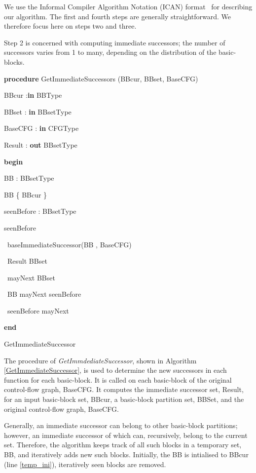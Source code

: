 \documentclass[3p,times,procedia,twocolumn,letterpaper]{elsarticle}
\begin{document}
We use the Informal Compiler Algorithm Notation (ICAN) format~\cite{j} for describing our algorithm. The first and fourth steps are generally straightforward. We therefore focus here on steps two and three.
 
Step 2 is concerned with computing immediate successors; the number of successors varies from 1 to many, depending on the distribution of the basic-blocks.

\begin{algorithm}
{\bfseries procedure} GetImmediateSuccessors (BBcur, BBset, BaseCFG)

BBcur :{\bfseries  in} BBType
 
BBset : {\bfseries in} BBsetType

BaseCFG : {\bfseries in} CFGType

Result : {\bfseries out} BBsetType



{\bfseries begin} 

BB : BBsetType

BB  \{ BBcur \}
\label{temp_ini}

seenBefore : BBsetType

seenBefore   

\nl{}  { 
\label{l0}

\   baseImmediateSuccessor(BB , BaseCFG) 
\label{l1}

\ Result     BBset
\label{l2} 
 
\ mayNext    BBset  
\label{l3}

\ BB  mayNext  seenBefore
\label{l4}

\ seenBefore  mayNext
\label{l5}
}
{\bfseries end}

\caption{GetImmediateSuccessor}
\label{GetImmediateSuccessor}
\end{algorithm}

The procedure of \emph{GetImmdediateSuccessor}, shown in Algorithm \ref{GetImmediateSuccessor}, is used to determine the new successors in each function for each basic-block. It is called on each basic-block of the original control-flow graph, BaseCFG. It computes the immediate successor set, Result, for an input basic-block set, BBcur, a basic-block partition set, BBSet, and the original control-flow graph, BaseCFG.

Generally, an immediate successor can belong to other basic-block partitions; however, an immediate successor of which can, recursively, belong to the current set. Therefore, the algorithm keeps track of all such blocks in a temporary set, BB, and iteratively adds new such blocks. Initially, the BB is intialised to BBcur (line \ref{temp_ini}), iteratively seen blocks are removed.
\end{document}
